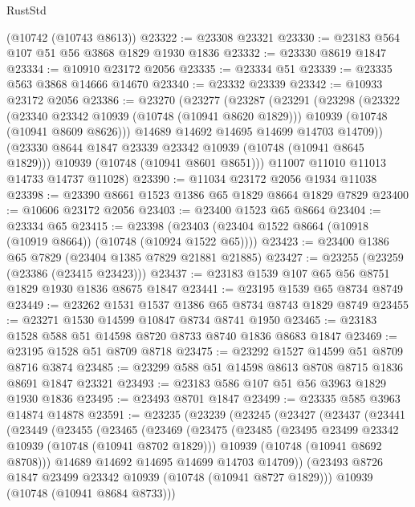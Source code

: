 \begin{lexlean}{RustStd}
\begin{coremodule}
{\begin{coremodule}
{{{{{    (@10742 (@10743 @8613))
@23322 := @23308 @23321
@23330 := @23183 @564 @107 @51 @56 @3868 @1829 @1930 @1836
@23332 := @23330 @8619 @1847
@23334 := @10910 @23172 @2056
@23335 := @23334 @51
@23339 := @23335 @563 @3868 @14666 @14670
@23340 := @23332 @23339
@23342 := @10933 @23172 @2056
@23386 := @23270
    (@23277
      (@23287
        (@23291
          (@23298
            (@23322
              (@23340 @23342 @10939 (@10748 (@10941 @8620 @1829)))
              @10939
              (@10748 (@10941 @8609 @8626)))
            @14689
            @14692
            @14695
            @14699
            @14703
            @14709))
        (@23330 @8644 @1847 @23339 @23342 @10939 (@10748 (@10941 @8645 @1829)))
        @10939
        (@10748 (@10941 @8601 @8651)))
      @11007
      @11010
      @11013
      @14733
      @14737
      @11028)
@23390 := @11034 @23172 @2056 @1934 @11038
@23398 := @23390 @8661 @1523 @1386 @65 @1829 @8664 @1829 @7829
@23400 := @10606 @23172 @2056
@23403 := @23400 @1523 @65 @8664
@23404 := @23334 @65
@23415 := @23398 (@23403 (@23404 @1522 @8664 (@10918 (@10919 @8664)) (@10748 (@10924 @1522 @65))))
@23423 := @23400 @1386 @65 @7829 (@23404 @1385 @7829 @21881 @21885)
@23427 := @23255 (@23259 (@23386 (@23415 @23423)))
@23437 := @23183 @1539 @107 @65 @56 @8751 @1829 @1930 @1836 @8675 @1847
@23441 := @23195 @1539 @65 @8734 @8749
@23449 := @23262 @1531 @1537 @1386 @65 @8734 @8743 @1829 @8749
@23455 := @23271 @1530 @14599 @10847 @8734 @8741 @1950
@23465 := @23183 @1528 @588 @51 @14598 @8720 @8733 @8740 @1836 @8683 @1847
@23469 := @23195 @1528 @51 @8709 @8718
@23475 := @23292 @1527 @14599 @51 @8709 @8716 @3874
@23485 := @23299 @588 @51 @14598 @8613 @8708 @8715 @1836 @8691 @1847 @23321
@23493 := @23183 @586 @107 @51 @56 @3963 @1829 @1930 @1836
@23495 := @23493 @8701 @1847
@23499 := @23335 @585 @3963 @14874 @14878
@23591 := @23235
    (@23239
      (@23245
        (@23427
          (@23437
            (@23441
              (@23449
                (@23455
                  (@23465
                    (@23469
                      (@23475
                        (@23485
                          (@23495 @23499 @23342 @10939 (@10748 (@10941 @8702 @1829)))
                          @10939
                          (@10748 (@10941 @8692 @8708)))
                        @14689
                        @14692
                        @14695
                        @14699
                        @14703
                        @14709))
                    (@23493 @8726 @1847 @23499 @23342 @10939 (@10748 (@10941 @8727 @1829)))
                    @10939
                    (@10748 (@10941 @8684 @8733)))
}}}}}
\end{coremodule}}
\end{coremodule}
\end{lexlean}
